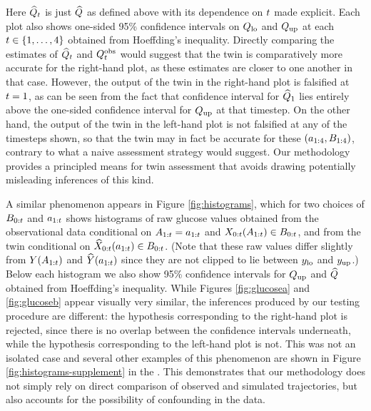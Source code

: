 %
%
%
%
%
Here $\widehat{Q}_t$ is just $\widehat{Q}$ as defined above with its dependence on $t$ made explicit.
Each plot also shows one-sided 95\% confidence intervals on $Q_{\mathrm{lo}}$ and $Q_{\mathrm{up}}$ at each $t \in \{1, \ldots, 4\}$ obtained from Hoeffding's inequality. 
Directly comparing the estimates of $\widehat{Q}_t$ and $Q^{\textup{obs}}_t$ would suggest that the twin is comparatively more accurate for the right-hand plot, as these estimates are closer to one another in that case.
However, the output of the twin in the right-hand plot is falsified at $t = 1$, as can be seen from the fact that confidence interval for $\widehat{Q}_1$ lies entirely above the one-sided confidence interval for $Q_{\mathrm{up}}$ at that timestep.
On the other hand, the output of the twin in the left-hand plot is not falsified at any of the timesteps shown, so that the twin may in fact be accurate for these $(a_{1:4}, B_{1:4})$, contrary to what a naive assessment strategy would suggest.
Our methodology provides a principled means for twin assessment that avoids drawing potentially misleading inferences of this kind.


A similar phenomenon appears in Figure \ref{fig:histograms}, which for two choices of $B_{0:t}$ and $a_{1:t}$ shows histograms of raw glucose values obtained from the observational data conditional on $A_{1:t}=a_{1:t}$ and $X_{0:t}(A_{1:t})\in B_{0:t}$, and from the twin conditional on $\widehat{X}_{0:t}(a_{1:t})\in B_{0:t}$.
(Note that these raw values differ slightly from $Y(A_{1:t})$ and $\widehat{Y}(a_{1:t})$ since they are not clipped to lie between $y_{\mathrm{lo}}$ and $y_{\mathrm{up}}$.)
%
Below each histogram we also show 95\% confidence intervals for $Q_{\mathrm{up}}$ and $\widehat{Q}$ obtained from Hoeffding's inequality.
While Figures \ref{fig:glucosea} and \ref{fig:glucoseb} appear visually very similar, the inferences produced by our testing procedure are different: the hypothesis corresponding to the right-hand plot is rejected, since there is no overlap between the confidence intervals underneath, while the hypothesis corresponding to the left-hand plot is not.
This was not an isolated case and several other examples of this phenomenon are shown in Figure \ref{fig:histograms-supplement} in the \AppendixName. 
This demonstrates that our methodology does not simply rely on direct comparison of observed and simulated trajectories, but also accounts for the possibility of confounding in the data.

%
%
%
%
%



